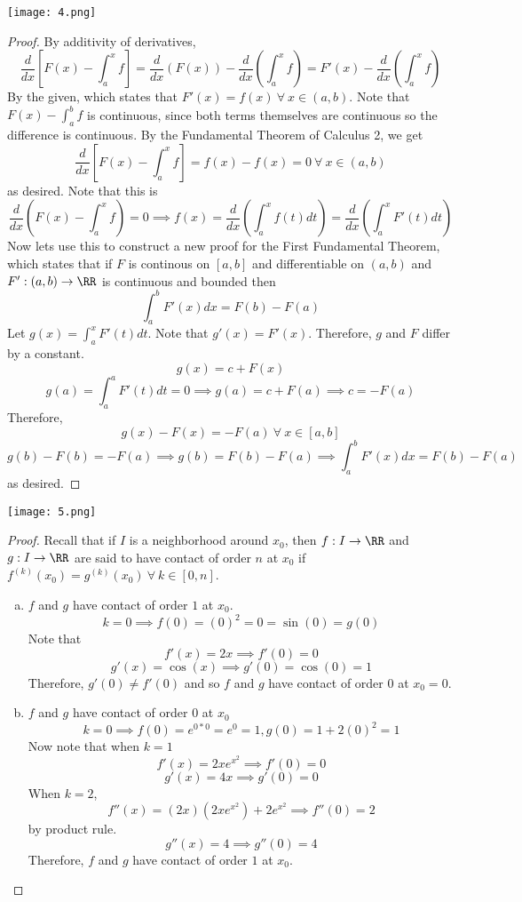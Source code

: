 \documentclass[12pt]{scrartcl}
\begin{document}
\texttt{[image: 4.png]}
\begin{proof}
  
  By additivity of derivatives, 
  \[\frac{d}{dx}\left[ F(x) - \int_a^x f\right] = \frac{d}{dx}(F(x)) -\frac{d}{dx}(\int_a^x f) = F'(x) - \frac{d}{dx}(\int_a^x f)\]
  By the given, which states that $F'(x) = f(x) \ \forall \ x \in (a,b)$. Note that $F(x) - \int_a^b f$ is continuous, since 
  both terms themselves are continuous so the difference is continuous. By the Fundamental Theorem of Calculus 2, 
  we get 
  \[\frac{d}{dx}\left[ F(x) - \int_a^x f\right] = f(x) - f(x) = 0 \ \forall \ x \in (a,b)\]
  as desired. Note that this is
  \[\frac{d}{dx}(F(x) - \int_a^x f) = 0 \implies f(x) = \frac{d}{dx}(\int_a^x f(t) dt) = \frac{d}{dx}(\int_a^x F'(t)dt)\]
  Now lets use this to construct a new proof for the First Fundamental Theorem, which states that
  if $F$ is continous on $[a,b]$ and differentiable on $(a,b)$ and $F': (a,b) \to \RR$ is continuous and bounded 
  then 
  \[\int_a^b F'(x) dx = F(b) - F(a)\]
  Let $g(x) = \int_a^x F'(t) dt$. Note that $g'(x) = F'(x)$. Therefore, $g$ and $F$ differ by a constant.
  \[g(x) = c + F(x)\]
  \[g(a) = \int_a^a F'(t) dt = 0 \implies g(a) = c + F(a) \implies c = -F(a)\]
  Therefore, 
  \[g(x) - F(x) = -F(a) \ \forall \ x \in [a,b]\]
  \[g(b) - F(b) = -F(a) \implies g(b) = F(b) - F(a) \implies \int_a^b F'(x) dx = F(b) - F(a)\]
  as desired.

\end{proof}
\newpage 

\texttt{[image: 5.png]}
\begin{proof}
  Recall that if $I$ is a neighborhood around $x_0$, then $f: I \to \RR$ and $g: I \to \RR$ 
  are said to have contact of order $n$ at $x_0$ if $f^{(k)}(x_0) = g^{(k)}(x_0) \ \forall \ k \in [0, n]$.
\hfill

\begin{enumerate}[a.]
  \item $f$ and $g$ have contact of order $1$ at $x_0$.
  \[k = 0 \implies f(0) = (0)^2 = 0 = \sin(0) = g(0)\]
   Note that
  \[f'(x) = 2x \implies f'(0) = 0\]
  \[g'(x) = \cos(x) \implies g'(0) = \cos(0) = 1\]
  Therefore, $g'(0) \neq f'(0)$ and so $f$ and $g$ have contact of order $0$ at $x_0 = 0$.

  \item $f$ and $g$ have contact of order $0$ at $x_0$
  \[k = 0 \implies f(0) = e^{0 * 0} = e^0 = 1, g(0) = 1 + 2(0)^2 = 1\]
  Now note that when $k = 1$
  \[f'(x) = 2xe^{x^2} \implies f'(0) = 0\]
  \[g'(x) = 4x \implies g'(0) = 0\]
  When $k = 2$, 
  \[f''(x) = (2x)(2xe^{x^2}) + 2e^{x^2} \implies f''(0) = 2\]
  by product rule.
  \[g''(x) = 4 \implies g''(0) = 4\]
  Therefore, $f$ and $g$ have contact of order $1$ at $x_0$.
\end{enumerate}

\end{proof}
\newpage 
\end{document}
